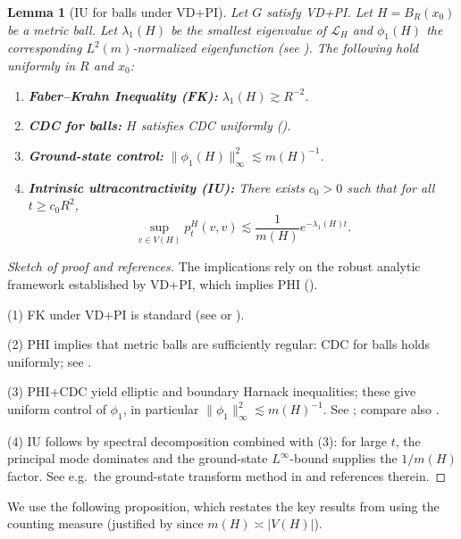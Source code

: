 \documentclass{article}
\numberwithin{equation}{section}
\newtheorem{lemma}[theorem]{Lemma}
\theoremstyle{definition}
\theoremstyle{remark}
\newcommand{\LL}{\mathcal{L}}
\begin{document}
\begin{lemma}[IU for balls under VD+PI]\label{lem:IU_derivation}
Let $G$ satisfy VD+PI. Let $H=B_R(x_0)$ be a metric ball. Let $\lambda_1(H)$ be the smallest eigenvalue of $\LL_H$ and $\phi_1(H)$ the corresponding $L^2(m)$-normalized eigenfunction (see ). The following hold uniformly in $R$ and $x_0$:
\begin{enumerate}
    \item \textbf{Faber--Krahn Inequality (FK):} $\lambda_1(H) \gtrsim R^{-2}$.
    \item \textbf{CDC for balls:} $H$ satisfies CDC uniformly \textup{(}\textup{)}.
    \item \textbf{Ground-state control:} $\|\phi_1(H)\|_{\infty}^2 \lesssim m(H)^{-1}$.
    \item \textbf{Intrinsic ultracontractivity (IU):} There exists $c_0>0$ such that for all $t\ge c_0 R^2$,
    \[
    \sup_{v \in V(H)} p_t^H(v,v) \lesssim \frac{1}{m(H)} e^{-\lambda_1(H) t}.
    \]
\end{enumerate}
\end{lemma}
\begin{proof}[Sketch of proof and references]
The implications rely on the robust analytic framework established by VD+PI, which implies PHI ().


(1) FK under VD+PI is standard (see \cite[Ch. 8]{Grigoryan09} or \cite[Prop. 5.1]{BarlowBass04}).

(2) PHI implies that metric balls are sufficiently regular: CDC for balls holds uniformly; see .


(3) PHI+CDC yield elliptic and boundary Harnack inequalities; these give uniform control of $\phi_1$, in particular $\|\phi_1\|_\infty^2\lesssim m(H)^{-1}$. See \cite[Thm.~4.5]{BarlowBassKumagai09}; compare also \cite{BassKumagai08}.

(4) IU follows by spectral decomposition combined with (3): for large $t$, the principal mode dominates and the ground-state $L^\infty$-bound supplies the $1/m(H)$ factor. See e.g.\ the ground-state transform method in \cite{Grigoryan09} and references therein.
\end{proof}


We use the following proposition, which restates the key results from  using the counting measure (justified by  since $m(H) \asymp |V(H)|$).
\end{document}
